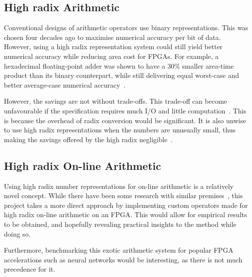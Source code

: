 \subsection{High radix Arithmetic}
Conventional designs of arithmetic operators use binary representations.
This was chosen four decades ago to maximise numerical accuracy per bit of data.
However, using a high radix representation system could still yield better
numerical accuracy while reducing area cost for FPGAs.
For example, a hexadecimal floating-point adder was shown to have a 30\% smaller
area-time product than its binary counterpart, while still delivering equal
worst-case and better average-case numerical accuracy~\cite{Catanzaro1}.

However, the savings are not without trade-offs.
This trade-off can become unfavourable if the specification requires much I/O
and little computation~\cite{Whyte1}.
This is because the overhead of radix conversion would be significant.
It is also unwise to use high radix representations when the numbers are
unusually small, thus making the savings offered by the high radix
negligible~\cite{Catanzaro1}.

\subsection{High radix On-line Arithmetic}
Using high radix number representations for on-line arithmetic is a
relatively novel concept.
While there have been some research with similar
premises~\cite{Lynch1}\cite{Lynch2},
this project takes a more direct approach by implementing custom operators
made for high radix on-line arithmetic on an FPGA.
This would allow for empirical results to be obtained, and hopefully revealing
practical insights to the method while doing so.

Furthermore, benchmarking this exotic arithmetic system for popular FPGA
accelerations such as neural networks would be interesting, as there is not
much precedence for it.